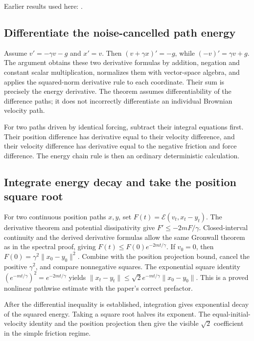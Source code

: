 \documentclass[11pt,a4paper]{report}
\begin{document}
Earlier results used here: \cite[Section~3.10.2]{LangevinLean2026ULASC}.
\subsection{\texorpdfstring{Differentiate the noise-cancelled path energy}{Differentiate the noise-cancelled path energy}}
\label{report-step-KineticLangevin-PotentialContraction-lean-4}


Assume \(v'=-\gamma v-g\) and \(x'=v\). Then \((v+\gamma x)'=-g\), while \((-v)'=\gamma v+g\). The argument obtains these two derivative formulas by addition, negation and constant scalar multiplication, normalizes them with vector-space algebra, and applies the squared-norm derivative rule to each coordinate. Their sum is precisely the energy derivative. The theorem assumes differentiability of the difference paths; it does not incorrectly differentiate an individual Brownian velocity path.



For two paths driven by identical forcing, subtract their integral equations first. Their position difference has derivative equal to their velocity difference, and their velocity difference has derivative equal to the negative friction and force difference. The energy chain rule is then an ordinary deterministic calculation.

\subsection{\texorpdfstring{Integrate energy decay and take the position square root}{Integrate energy decay and take the position square root}}
\label{report-step-KineticLangevin-PotentialContraction-lean-5}


For two continuous position paths \(x,y\), set \(F(t)=\mathcal E(v_t,x_t-y_t)\). The derivative theorem and potential dissipativity give \(F'\le-2mF/\gamma\). Closed-interval continuity and the derived derivative formulas allow the same Gronwall theorem as in the spectral proof, giving \(F(t)\le F(0)e^{-2mt/\gamma}\). If \(v_0=0\), then \(F(0)=\gamma^2\|x_0-y_0\|^2\). Combine with the position projection bound, cancel the positive \(\gamma^2\), and compare nonnegative squares. The exponential square identity \((e^{-mt/\gamma})^2=e^{-2mt/\gamma}\) yields \(\|x_t-y_t\|\le\sqrt2e^{-mt/\gamma}\|x_0-y_0\|\). This is a proved nonlinear pathwise estimate with the paper's correct prefactor.



After the differential inequality is established, integration gives exponential decay of the squared energy. Taking a square root halves its exponent. The equal-initial-velocity identity and the position projection then give the visible \(\sqrt2\) coefficient in the simple friction regime.
\end{document}
